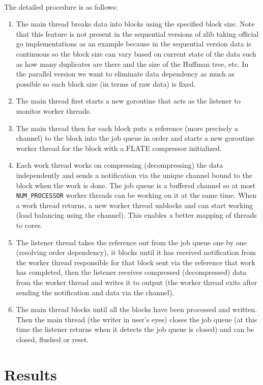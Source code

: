 \documentclass[12pt]{article}
\begin{document}
    ~\\
    The detailed procedure is as follows:
    \begin{enumerate}
        \item The main thread breaks data into blocks using the specified block size. Note that this feature is not present in the sequential versions of zlib taking official go implementations as an example because in the sequential version data is continuous so the block size can vary based on current state of the data such as how many duplicates are there and the size of the Huffman tree, etc. In the parallel version we want to eliminate data dependency as much as possible so each block size (in terms of raw data) is fixed.
        \item The main thread first starts a new goroutine that acts as the listener to monitor worker threads.
        \item The main thread then for each block puts a reference (more precisely a channel) to the block into the job queue in order and starts a new goroutine worker thread for the block with a FLATE compressor initialized.
        \item Each work thread works on compressing (decompressing) the data independently and sends a notification via the unique channel bound to the block when the work is done. The job queue is a buffered channel so at most \texttt{NUM\_PROCESSOR} worker threads can be working on it at the same time. When a work thread returns, a new worker thread unblocks and can start working (load balancing using the channel). This enables a better mapping of threads to cores.
        \item The listener thread takes the reference out from the job queue one by one (resolving order dependency), it blocks until it has received notification from the worker thread responsible for that block sent via the reference that work has completed, then the listener receives compressed (decompressed) data from the worker thread and writes it to output (the worker thread exits after sending the notification and data via the channel).
        \item The main thread blocks until all the blocks have been processed and written. Then the main thread (the writer in user's eyes) closes the job queue (at this time the listener returns when it detects the job queue is closed) and can be closed, flushed or reset.
    \end{enumerate}
\section{Results}
\end{document}
